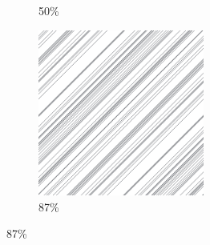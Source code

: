 \documentclass[12pt, fleqn]{report}                             %
\theoremstyle{break}                                            %
\begin{document}
\begin{figure}[ht!]
\begin{subfigure}[b]{0.4\linewidth}
          \caption{50\%}
        \end{subfigure}
        \begin{subfigure}[b]{0.4\linewidth}
          \includegraphics[width=0.6\textwidth]{Images/184/d.png}
          \caption{87\%}
        \end{subfigure}
      \end{figure}
\end{document}
